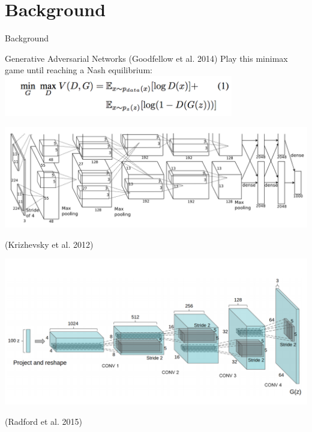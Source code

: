 \documentclass{beamer}
\begin{document}
\section{Background}
\begin{frame}{}
\centering
Background
\end{frame}


\begin{frame}{Generative Adversarial Networks (Goodfellow et al. 2014)}
Play this minimax game until reaching a Nash equilibrium:
\vskip0.5cm
\centering
\includegraphics[width=10cm]{img/reed/gan_eq.png}

\begin{minipage}{0.48\textwidth}
\includegraphics[width=1.0\linewidth]{img/reed/imagenet_cnn.png}
\end{minipage}
(Krizhevsky et al. 2012)
\hfill
\begin{minipage}{0.48\textwidth}
\includegraphics[width=1.0\linewidth]{img/reed/dcgan.png}
\end{minipage}
(Radford et al. 2015)

\end{frame}
\end{document}
